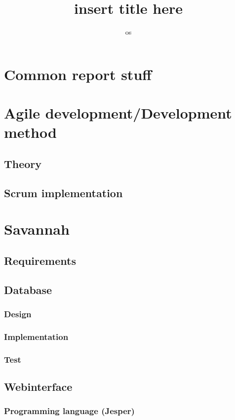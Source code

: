 

\title{insert title here} %
\author{os} %


\maketitle
\tableofcontents

\chapter{Common report stuff} %

\chapter{Agile development/Development method} %
 \section{Theory}
 \section{Scrum implementation}

\chapter{Savannah} %
  \section{Requirements} %
  \section{Database}
    \subsection{Design}
    \subsection{Implementation}
    \subsection{Test}

  \section{Webinterface}
     \subsection{Programming language (Jesper)}
      
